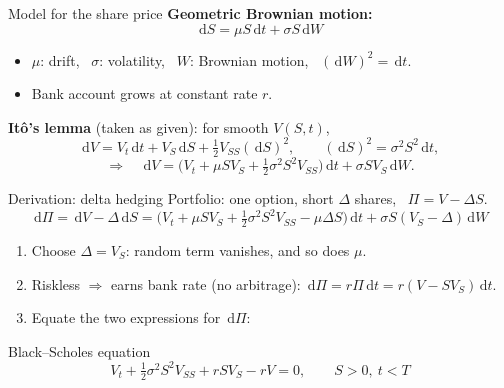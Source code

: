 \documentclass[11pt]{beamer}
\newcommand{\dd}{\,\mathrm d}
\begin{document}
\begin{frame}{Model for the share price}
  \textbf{Geometric Brownian motion:}
  \[
    \dd S=\mu S\dd t+\sigma S\dd W
  \]
  \begin{itemize}
    \item $\mu$: drift, \ $\sigma$: volatility, \ $W$: Brownian motion, \ $(\dd W)^2=\dd t$.
    \item Bank account grows at constant rate $r$.
  \end{itemize}
  \vspace{4pt}
  \textbf{Itô's lemma} (taken as given): for smooth $V(S,t)$,
  \[
    \dd V=V_t\dd t+V_S\dd S+\tfrac12V_{SS}(\dd S)^2,\qquad (\dd S)^2=\sigma^2S^2\dd t,
  \]
  \[
    \Rightarrow\quad \dd V=\Big(V_t+\mu SV_S+\tfrac12\sigma^2S^2V_{SS}\Big)\dd t+\sigma SV_S\dd W .
  \]
\end{frame}

\begin{frame}{Derivation: delta hedging}
  Portfolio: one option, short $\Delta$ shares, \ $\Pi=V-\Delta S$.
  {\small
  \[
    \dd\Pi=\dd V-\Delta\dd S
    =\Big(V_t+\mu SV_S+\tfrac12\sigma^2S^2V_{SS}-\mu\Delta S\Big)\dd t+\sigma S(V_S-\Delta)\dd W
  \]}
  \begin{enumerate}
    \item Choose $\Delta=V_S$: random term vanishes, and so does $\mu$.
    \item Riskless $\Rightarrow$ earns bank rate (no arbitrage): $\dd\Pi=r\Pi\dd t=r(V-SV_S)\dd t$.
    \item Equate the two expressions for $\dd\Pi$:
  \end{enumerate}
  \begin{block}{Black--Scholes equation}
    \[
      V_t+\tfrac12\sigma^2S^2V_{SS}+rSV_S-rV=0,\qquad S>0,\ t<T
    \]
  \end{block}
\end{frame}
\end{document}
